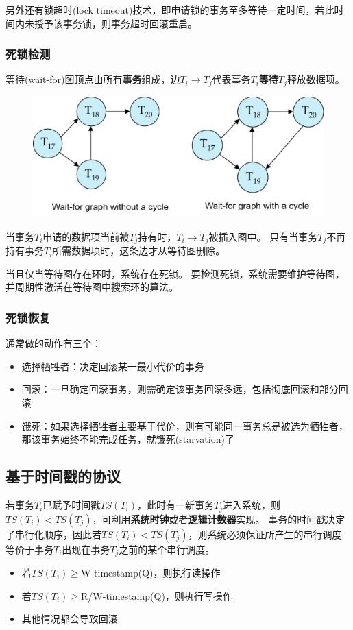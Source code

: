 另外还有锁超时(lock timeout)技术，即申请锁的事务至多等待一定时间，若此时间内未授予该事务锁，则事务超时回滚重启。

\subsubsection{死锁检测}
等待(wait-for)图顶点由所有\textbf{事务}组成，边$T_i\to T_j$代表事务$T_i$\textbf{等待}$T_j$释放数据项。
\begin{figure}[H]
\centering
\includegraphics[width=0.6\linewidth]{fig/wait-for_graph.png}
\end{figure}

当事务$T_i$申请的数据项当前被$T_j$持有时，$T_i\to T_j$被插入图中。
只有当事务$T_j$不再持有事务$T_i$所需数据项时，这条边才从等待图删除。

当且仅当等待图存在环时，系统存在死锁。
要检测死锁，系统需要维护等待图，并周期性激活在等待图中搜索环的算法。

\subsubsection{死锁恢复}
通常做的动作有三个：
\begin{itemize}
	\item 选择牺牲者：决定回滚某一最小代价的事务
	\item 回滚：一旦确定回滚事务，则需确定该事务回滚多远，包括彻底回滚和部分回滚
	\item 饿死：如果选择牺牲者主要基于代价，则有可能同一事务总是被选为牺牲者，那该事务始终不能完成任务，就饿死(starvation)了
\end{itemize}

\subsection{基于时间戳的协议}
若事务$T_i$已赋予时间戳$TS(T_i)$，此时有一新事务$T_j$进入系统，则$TS(T_i)<TS(T_j)$，可利用\textbf{系统时钟}或者\textbf{逻辑计数器}实现。
事务的时间戳决定了串行化顺序，因此若$TS(T_i)<TS(T_j)$，则系统必须保证所产生的串行调度等价于事务$T_i$出现在事务$T_j$之前的某个串行调度。

\begin{itemize}
	\item 若$TS(T_i)\geq$W-timestamp(Q)，则执行读操作
	\item 若$TS(T_i)\geq$R/W-timestamp(Q)，则执行写操作
	\item 其他情况都会导致回滚
\end{itemize}